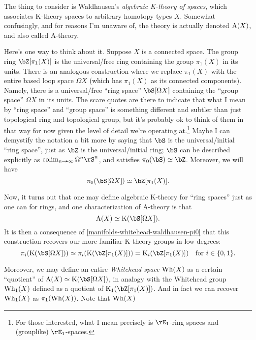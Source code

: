\begin{nothing}
\begin{subnothing}
    The thing to consider is Waldhausen's \emph{algebraic K-theory of spaces}, which associates K-theory spaces to arbitrary homotopy types $X$. Somewhat confusingly, and for reasons I'm unaware of, the theory is actually denoted $\operatorname{A}(X)$, and also called A-theory.

    Here's one way to think about it. Suppose $X$ is a connected space. The group ring $\bZ[\pi_1(X)]$ is the universal/free ring containing the group $\pi_1(X)$ in its units. There is an analogous construction where we replace $\pi_1(X)$ with the entire based loop space $\Omega X$ (which has $\pi_1(X)$ as its connected components). Namely, there is a universal/free ``ring space'' $\bS[\Omega X]$ containing the ``group space'' $\Omega X$ in its units. The scare quotes are there to indicate that what I mean by ``ring space'' and ``group space'' is something different and subtler than just topological ring and topological group, but it's probably ok to think of them in that way for now given the level of detail we're operating at.\footnote{For those interested, what I mean precisely is $\rE_1$-ring spaces and (grouplike) $\rE_1$-spaces.} Maybe I can demystify the notation a bit more by saying that $\bS$ is the universal/initial ``ring space'', just as $\bZ$ is the universal/initial ring; $\bS$ can be described explicitly as $\colim_{n \limto \infty} \Omega^n \rS^n$, and satisfies $\pi_0(\bS) \iso \bZ$. Moreover, we will have
    \begin{equation}
      \label{manifolds-whitehead-waldhausen-pi0}
      \pi_0(\bS[\Omega X]) \iso \bZ[\pi_1(X)].
    \end{equation}

    Now, it turns out that one may define algebraic K-theory for ``ring spaces'' just as one can for rings, and one characterization of A-theory is that
    \[
      \A(X) \iso \K(\bS[\Omega X]).
    \]
    It is then a consequence of \cref{manifolds-whitehead-waldhausen-pi0} that this construction recovers our more familiar K-theory groups in low degrees:
    \[
      \pi_i(\K(\bS[\Omega X])) \iso \pi_i(\K(\bZ[\pi_1(X)])) = \K_i(\bZ[\pi_1(X)]) \quad \text{for } i \in \{0,1\}.
    \]
  \end{subnothing}

  \begin{subnothing}
    \label{manifold-whitehead-space}
    Moreover, we may define an entire \emph{Whitehead space} $\operatorname{Wh}(X)$ as a certain ``quotient'' of $\A(X) \iso \K(\bS[\Omega X])$, in analogy with the Whitehead group $\operatorname{Wh}_1(X)$ defined as a quotient of $\K_1(\bZ[\pi_1(X)])$. And in fact we can recover $\operatorname{Wh}_1(X)$ as $\pi_1(\operatorname{Wh}(X))$. Note that $\operatorname{Wh}(X)$


\end{subnothing}
\end{nothing}
